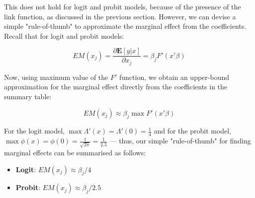 This does not hold for logit and probit models, because of the presence of the link function, as discussed in the previous section. However, we can devise a simple "rule-of-thumb" to approximate the marginal effect from the coefficients. Recall that for logit and probit models:

\begin{equation}
    EM(x_j) = \frac{\partial \mathbf{E}[y|x]}{\partial x_j} = \beta_j F'(x'\beta)
\end{equation}

Now, using maximum value of the $F'$ function, we obtain an upper-bound approximation for the marginal effect directly from the coefficients in the summary table:

\begin{equation}
    EM(x_j) \approx \beta_j \max F'(x'\beta)
\end{equation}

For the logit model, $\max \Lambda'(x) = \Lambda'(0) = \frac{1}{4}$ and for the probit model, $\max \phi(x) = \phi(0) = \frac{1}{\sqrt{2\pi}} = \frac{1}{2.5}$ --- thus, our simple "rule-of-thumb" for finding marginal effects can be summarised as follows:

\begin{itemize}
    \item \textbf{Logit}: $EM(x_j) \approx \beta_j/4$
    \item \textbf{Probit}: $EM(x_j) \approx \beta_j/2.5$
\end{itemize}



